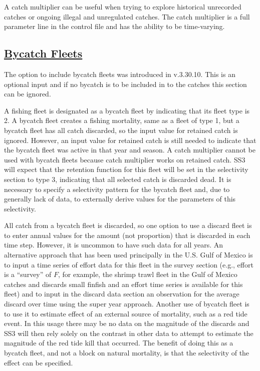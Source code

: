 A catch multiplier can be useful when trying to explore historical unrecorded catches or ongoing illegal and unregulated catches. The catch multiplier is a full parameter line in the control file and has the ability to be time-varying.   

\hypertarget{BycatchFleets}{}
\subsection[Bycatch Fleets]{\protect\hyperlink{BycatchFleets}{Bycatch Fleets}}
The option to include bycatch fleets was introduced in v.3.30.10. This is an optional input and if no bycatch is to be included in to the catches this section can be ignored.

A fishing fleet is designated as a bycatch fleet by indicating that its fleet type is 2. A bycatch fleet creates a fishing mortality, same as a fleet of type 1, but a bycatch fleet has all catch discarded, so the input value for retained catch is ignored. However, an input value for retained catch is still needed to indicate that the bycatch fleet was active in that year and season. A catch multiplier cannot be used with bycatch fleets because catch multiplier works on retained catch. SS3 will expect that the retention function for this fleet will be set in the selectivity section to type 3, indicating that all selected catch is discarded dead. It is necessary to specify a selectivity pattern for the bycatch fleet and, due to generally lack of data, to externally derive values for the parameters of this selectivity.

All catch from a bycatch fleet is discarded, so one option to use a discard fleet is to enter annual values for the amount (not proportion) that is discarded in each time step. However, it is uncommon to have such data for all years. An alternative approach that has been used principally in the U.S. Gulf of Mexico is to input a time series of effort data for this fleet in the survey section (e.g.,  effort is a ``survey'' of $F$, for example, the shrimp trawl fleet in the Gulf of Mexico catches and discards small finfish and an effort time series is available for this fleet) and to input in the discard data section an observation for the average discard over time using the super year approach. Another use of bycatch fleet is to use it to estimate effect of an external source of mortality, such as a red tide event. In this usage there may be no data on the magnitude of the discards and SS3 will then rely solely on the contrast in other data to attempt to estimate the magnitude of the red tide kill that occurred. The benefit of doing this as a bycatch fleet, and not a block on natural mortality, is that the selectivity of the effect can be specified. 


